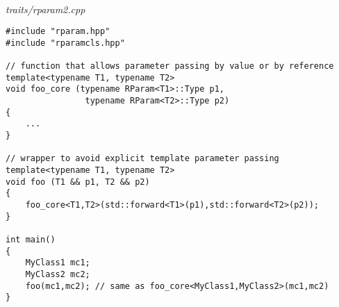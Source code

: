 \hspace*{\fill} \\ %
\noindent
\textit{traits/rparam2.cpp}
\begin{lstlisting}[style=styleCXX]
#include "rparam.hpp"
#include "rparamcls.hpp"

// function that allows parameter passing by value or by reference
template<typename T1, typename T2>
void foo_core (typename RParam<T1>::Type p1,
				typename RParam<T2>::Type p2)
{
	...
}

// wrapper to avoid explicit template parameter passing
template<typename T1, typename T2>
void foo (T1 && p1, T2 && p2)
{
	foo_core<T1,T2>(std::forward<T1>(p1),std::forward<T2>(p2));
}

int main()
{
	MyClass1 mc1;
	MyClass2 mc2;
	foo(mc1,mc2); // same as foo_core<MyClass1,MyClass2>(mc1,mc2)
}
\end{lstlisting}











